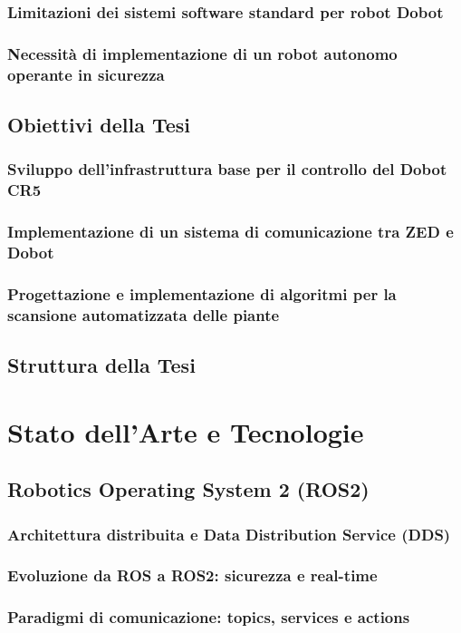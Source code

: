 \documentclass[12pt,a4paper,twoside,openright]{book}
\begin{document}
	\subsection{Limitazioni dei sistemi software standard per robot Dobot}
	\subsection{Necessità di implementazione di un robot autonomo operante in sicurezza}
	
	\section{Obiettivi della Tesi}
	\subsection{Sviluppo dell'infrastruttura base per il controllo del Dobot CR5}
	\subsection{Implementazione di un sistema di comunicazione tra ZED e Dobot}
	\subsection{Progettazione e implementazione di algoritmi per la scansione automatizzata delle piante}
	
	\section{Struttura della Tesi}
	
	\chapter{Stato dell'Arte e Tecnologie}
	\section{Robotics Operating System 2 (ROS2)}
	\subsection{Architettura distribuita e Data Distribution Service (DDS)}
	\subsection{Evoluzione da ROS a ROS2: sicurezza e real-time}
	\subsection{Paradigmi di comunicazione: topics, services e actions}
\end{document}
